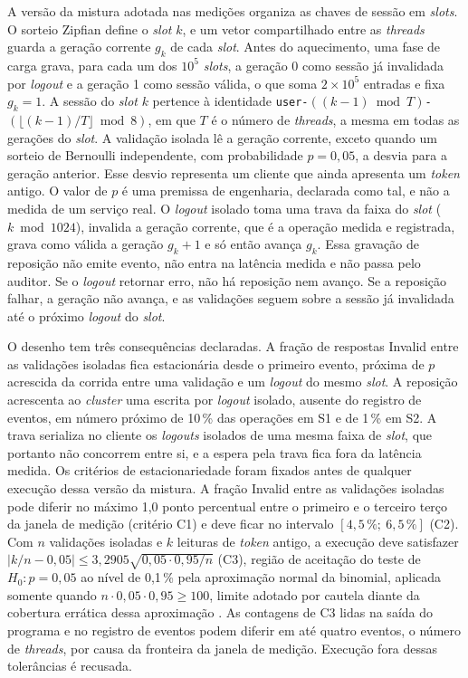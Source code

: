 A versão da mistura adotada nas medições organiza as chaves de sessão em \emph{slots}. O sorteio Zipfian define o \emph{slot} $k$, e um vetor compartilhado entre as \emph{threads} guarda a geração corrente $g_k$ de cada \emph{slot}. Antes do aquecimento, uma fase de carga grava, para cada um dos $10^5$ \emph{slots}, a geração 0 como sessão já invalidada por \emph{logout} e a geração 1 como sessão válida, o que soma $2 \times 10^5$ entradas e fixa $g_k = 1$. A sessão do \emph{slot} $k$ pertence à identidade \texttt{user-}$((k-1) \bmod T)$\texttt{-}$(\lfloor (k-1)/T \rfloor \bmod 8)$, em que $T$ é o número de \emph{threads}, a mesma em todas as gerações do \emph{slot}. A validação isolada lê a geração corrente, exceto quando um sorteio de Bernoulli independente, com probabilidade $p = 0{,}05$, a desvia para a geração anterior. Esse desvio representa um cliente que ainda apresenta um \emph{token} antigo. O valor de $p$ é uma premissa de engenharia, declarada como tal, e não a medida de um serviço real. O \emph{logout} isolado toma uma trava da faixa do \emph{slot} ($k \bmod 1024$), invalida a geração corrente, que é a operação medida e registrada, grava como válida a geração $g_k + 1$ e só então avança $g_k$. Essa gravação de reposição não emite evento, não entra na latência medida e não passa pelo auditor. Se o \emph{logout} retornar erro, não há reposição nem avanço. Se a reposição falhar, a geração não avança, e as validações seguem sobre a sessão já invalidada até o próximo \emph{logout} do \emph{slot}.

O desenho tem três consequências declaradas. A fração de respostas \textsf{Invalid} entre as validações isoladas fica estacionária desde o primeiro evento, próxima de $p$ acrescida da corrida entre uma validação e um \emph{logout} do mesmo \emph{slot}. A reposição acrescenta ao \emph{cluster} uma escrita por \emph{logout} isolado, ausente do registro de eventos, em número próximo de 10\,\% das operações em S1 e de 1\,\% em S2. A trava serializa no cliente os \emph{logouts} isolados de uma mesma faixa de \emph{slot}, que portanto não concorrem entre si, e a espera pela trava fica fora da latência medida. Os critérios de estacionariedade foram fixados antes de qualquer execução dessa versão da mistura. A fração \textsf{Invalid} entre as validações isoladas pode diferir no máximo 1,0 ponto percentual entre o primeiro e o terceiro terço da janela de medição (critério C1) e deve ficar no intervalo $[4{,}5\,\%;\ 6{,}5\,\%]$ (C2). Com $n$ validações isoladas e $k$ leituras de \emph{token} antigo, a execução deve satisfazer $|k/n - 0{,}05| \le 3{,}2905 \sqrt{0{,}05 \cdot 0{,}95 / n}$ (C3), região de aceitação do teste de $H_0\colon p = 0{,}05$ ao nível de 0,1\,\% pela aproximação normal da binomial, aplicada somente quando $n \cdot 0{,}05 \cdot 0{,}95 \ge 100$, limite adotado por cautela diante da cobertura errática dessa aproximação \citep{brown_cai_dasgupta_binomial_2001}. As contagens de C3 lidas na saída do programa e no registro de eventos podem diferir em até quatro eventos, o número de \emph{threads}, por causa da fronteira da janela de medição. Execução fora dessas tolerâncias é recusada.

